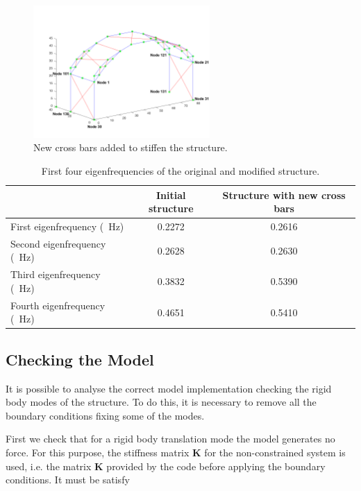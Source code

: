 \documentclass[AMdocument,optEnglish]{AMlatex}  %
\begin{document}
\begin{figure}[ht] 
	\centering
	\includegraphics[width=0.6\textwidth]{additional_cross_bars} 
	\caption{New cross bars added to stiffen the structure.}
	\label{fig:new_bars}
\end{figure}

\begin{table}[]
	\centering
	\begin{tabular}{lcc}
		\toprule
		& Initial structure & Structure with new cross bars \\
		\midrule
		First eigenfrequency (\SI{}{\hertz})  & 0.2272            & 0.2616                        \\
		Second eigenfrequency (\SI{}{\hertz}) & 0.2628            & 0.2630                        \\
		Third eigenfrequency (\SI{}{\hertz})  & 0.3832            & 0.5390                        \\
		Fourth eigenfrequency (\SI{}{\hertz}) & 0.4651            & 0.5410 \\      
		\bottomrule                 
	\end{tabular}
	\caption{First four eigenfrequencies of the original and modified structure.}
	\label{table:new_bars_frew}
\end{table}

\subsection{Checking the Model}

It is possible to analyse the correct model implementation checking the rigid body modes of the structure. To do this, it is necessary to remove all the boundary conditions fixing some of the modes.

First we check that for a rigid body translation mode the model generates no force. For this purpose, the stiffness matrix $\bm{K}$ for the non-constrained system is used, i.e. the matrix $\bm{K}$ provided by the code before applying the boundary conditions. It must be satisfy
\end{document}
